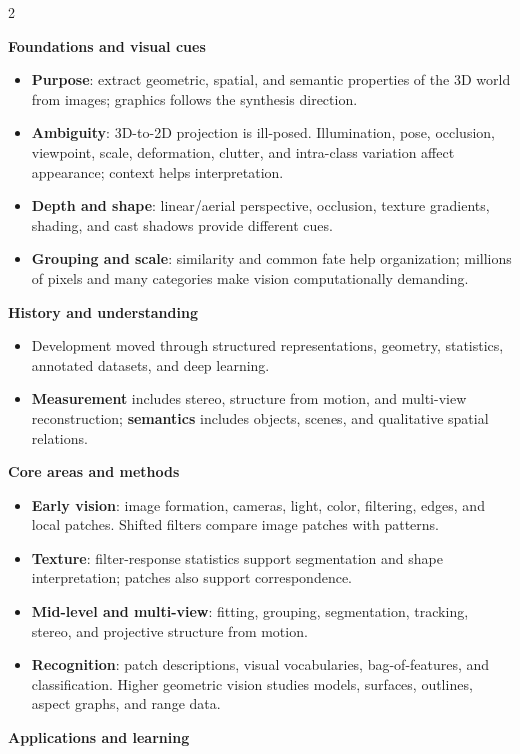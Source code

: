 \documentclass[11pt,a4paper,oneside]{report}
\newcommand{\reviewgroup}[1]{%
  \par\vspace{0.7em}%
  {\sffamily\bfseries\color{SapienzaRed}#1}\par\vspace{0.10em}%
}
\begin{document}
\begin{multicols}{2}
\normalsize
\setlength{\columnsep}{0.8cm}
\setlength{\emergencystretch}{1.5em}
\reviewgroup{Foundations and visual cues}
\begin{itemize}
\item \textbf{Purpose}: extract geometric, spatial, and semantic properties of the 3D world from images; graphics follows the synthesis direction.
\item \textbf{Ambiguity}: 3D-to-2D projection is ill-posed. Illumination, pose, occlusion, viewpoint, scale, deformation, clutter, and intra-class variation affect appearance; context helps interpretation.
\item \textbf{Depth and shape}: linear/aerial perspective, occlusion, texture gradients, shading, and cast shadows provide different cues.
\item \textbf{Grouping and scale}: similarity and common fate help organization; millions of pixels and many categories make vision computationally demanding.
\end{itemize}
\reviewgroup{History and understanding}
\begin{itemize}
\item Development moved through structured representations, geometry, statistics, annotated datasets, and deep learning.
\item \textbf{Measurement} includes stereo, structure from motion, and multi-view reconstruction; \textbf{semantics} includes objects, scenes, and qualitative spatial relations.
\end{itemize}
\reviewgroup{Core areas and methods}
\begin{itemize}
\item \textbf{Early vision}: image formation, cameras, light, color, filtering, edges, and local patches. Shifted filters compare image patches with patterns.
\item \textbf{Texture}: filter-response statistics support segmentation and shape interpretation; patches also support correspondence.
\item \textbf{Mid-level and multi-view}: fitting, grouping, segmentation, tracking, stereo, and projective structure from motion.
\item \textbf{Recognition}: patch descriptions, visual vocabularies, bag-of-features, and classification. Higher geometric vision studies models, surfaces, outlines, aspect graphs, and range data.
\end{itemize}
\reviewgroup{Applications and learning}

\end{multicols}
\end{document}
